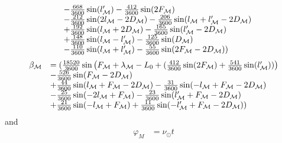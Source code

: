 \documentclass[11pt,
               a4paper,
               bibtotoc,
               idxtotoc,
               headsepline,
               footsepline,
               footexclude,
               BCOR12mm,
               DIV13,
               openany,   %
               ]
               {scrbook}
\begin{document}
\begin{itemize}
\begin{equation}
\begin{array}{ll}
\begin{array}{ll}
                    &- {668\over 3600} \sin(l'_{\mathcal M}) - {412\over 3600} \sin(2 F_{\mathcal M})\\
                    &- {212\over 3600} \sin(2 l_{\mathcal M} - 2 D_{\mathcal M})
                    - {206\over 3600} \sin(l_{\mathcal M} + l'_{\mathcal M} - 2 D_{\mathcal M})\\
                    &+ {192\over 3600} \sin(l_{\mathcal M} + 2 D_{\mathcal M})
                    - {165\over 3600} \sin(l'_{\mathcal M} - 2 D_{\mathcal M})\\
                    &+ {148\over 3600} \sin(l_{\mathcal M} - l'_{\mathcal M})
                    - {125\over 3600} \sin(D_{\mathcal M})\\
                    &- {110\over 3600} \sin(l_{\mathcal M} + l'_{\mathcal M})
                    - {55\over 3600} \sin(2 F_{\mathcal M} - 2 D_{\mathcal M}) )
                \end{array}
            \end{array}
        \end{equation}
        \begin{equation}
            \begin{array}{ll}
                \beta_{{\mathcal M}} &= ( {18520\over 3600} \sin\left(F_{{\mathcal M}}
                + \lambda_{{\mathcal M}}-L_0 +  ( {412\over 3600} \sin(2F_{{\mathcal M}})
                + {541\over 3600} \sin(l'_{{\mathcal M}})) \right)\\
                &- {526\over 3600} \sin(F_{{\mathcal M}} - 2D_{{\mathcal M}})\\
                &+ {44\over 3600} \sin(l_{{\mathcal M}} + F_{{\mathcal M}} - 2D_{{\mathcal M}})
                - {31\over 3600} \sin(-l_{{\mathcal M}} + F_{{\mathcal M}} - 2D_{{\mathcal M}})\\
                &- {25\over 3600} \sin(-2l_{{\mathcal M}} + F_{\mathcal M})
                - {23\over 3600} \sin(l'_{\mathcal M}
                + F_{\mathcal M} - 2D_{\mathcal M})\\
                &+ {21\over 3600} \sin(-l_{\mathcal M} + F_{\mathcal M})
                + {11\over 3600} \sin(-l'_{\mathcal M} + F_{\mathcal M} - 2D_{\mathcal M}) )
            \end{array}
        \end{equation}
        and
        \begin{equation}
            \begin{array}{ll}
                \varphi_{M}&=\nu_\odot t\\

\end{array}
\end{equation}
\end{itemize}
\end{document}
